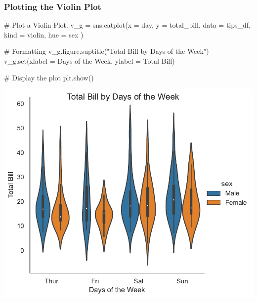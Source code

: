 \documentclass[
  letterpaper,
  DIV=11,
  numbers=noendperiod]{scrartcl}
\newenvironment{Shaded}{\begin{snugshade}}{\end{snugshade}}
\newcommand{\BuiltInTok}[1]{\textcolor[rgb]{0.00,0.46,0.62}{#1}}
\newcommand{\CommentTok}[1]{\textcolor[rgb]{0.37,0.37,0.37}{#1}}
\newcommand{\NormalTok}[1]{\textcolor[rgb]{0.00,0.46,0.62}{#1}}
\newcommand{\OperatorTok}[1]{\textcolor[rgb]{0.37,0.37,0.37}{#1}}
\newcommand{\StringTok}[1]{\textcolor[rgb]{0.13,0.47,0.30}{#1}}
\begin{document}
\hypertarget{plotting-the-violin-plot}{%
\subsubsection{Plotting the Violin
Plot}\label{plotting-the-violin-plot}}

\begin{Shaded}
\begin{Highlighting}[]
\CommentTok{\# Plot a Violin Plot.}
\NormalTok{v\_g }\OperatorTok{=}\NormalTok{ sns.catplot(x }\OperatorTok{=} \StringTok{\textquotesingle{}day\textquotesingle{}}\NormalTok{,}
\NormalTok{                  y }\OperatorTok{=} \StringTok{\textquotesingle{}total\_bill\textquotesingle{}}\NormalTok{,}
\NormalTok{                  data }\OperatorTok{=}\NormalTok{ tips\_df,}
\NormalTok{                  kind }\OperatorTok{=} \StringTok{\textquotesingle{}violin\textquotesingle{}}\NormalTok{,}
\NormalTok{                  hue }\OperatorTok{=} \StringTok{\textquotesingle{}sex\textquotesingle{}}
\NormalTok{                )}
                    
\CommentTok{\# Formatting}
\NormalTok{v\_g.figure.suptitle(}\StringTok{"Total Bill by Days of the Week"}\NormalTok{)}
\NormalTok{v\_g.}\BuiltInTok{set}\NormalTok{(xlabel }\OperatorTok{=} \StringTok{\textquotesingle{}Days of the Week\textquotesingle{}}\NormalTok{,}
\NormalTok{        ylabel }\OperatorTok{=} \StringTok{\textquotesingle{}Total Bill\textquotesingle{}}\NormalTok{)}
  
\CommentTok{\# Display the plot      }
\NormalTok{plt.show()}
\end{Highlighting}
\end{Shaded}

\includegraphics{data_visualization_with_seaborn_files/figure-pdf/cell-19-output-1.pdf}
\end{document}
